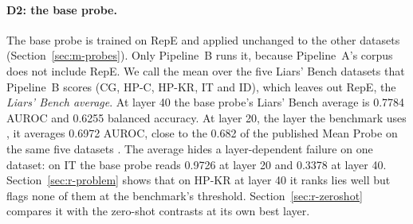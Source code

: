 \paragraph{D2: the base probe.} The base probe is trained on RepE and applied unchanged to the other datasets (Section~\ref{sec:m-probes}). %
Only Pipeline~B runs it, because Pipeline~A's corpus does not include RepE. %
We call the mean over the five Liars' Bench datasets that Pipeline~B scores (CG, HP-C, HP-KR, IT and ID), which leaves out RepE, the \emph{Liars' Bench average}. %
At layer 40 the base probe's Liars' Bench average is 0.7784 AUROC and 0.6255 balanced accuracy. %
At layer 20, the layer the benchmark uses \parencite[p.~69]{kretschmar2025liars}, it averages 0.6972 AUROC, close to the 0.682 of the published Mean Probe on the same five datasets \parencite[p.~54]{kretschmar2025liars}. %
The average hides a layer-dependent failure on one dataset: on IT the base probe reads 0.9726 at layer 20 and 0.3378 at layer 40. %
Section~\ref{sec:r-problem} shows that on HP-KR at layer 40 it ranks lies well but flags none of them at the benchmark's threshold. %
Section~\ref{sec:r-zeroshot} compares it with the zero-shot contrasts at its own best layer.

